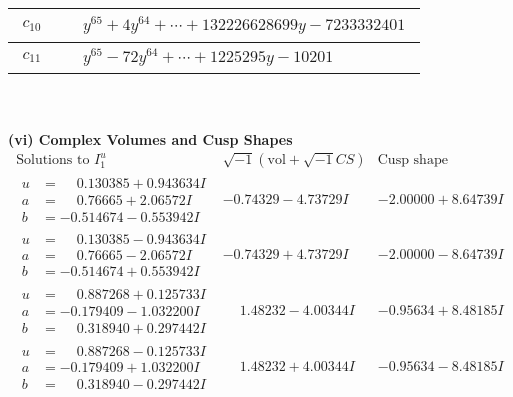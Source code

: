 \documentclass[1p]{elsarticle_modified}
\theoremstyle{definition}
\newcommand{\I}{\sqrt{-1}}
\begin{document}
\begin{tabular}{m{50pt}|m{274pt}}
\hline $$\begin{aligned}c_{10}\end{aligned}$$&$\begin{aligned}
&y^{65}+4 y^{64}+\cdots+132226628699 y-7233332401
\end{aligned}$\\
\hline $$\begin{aligned}c_{11}\end{aligned}$$&$\begin{aligned}
&y^{65}-72 y^{64}+\cdots+1225295 y-10201
\end{aligned}$\\
\hline
\end{tabular}\\~\\
\newpage\flushleft \textbf{(vi) Complex Volumes and Cusp Shapes}
$$\begin{array}{c|c|c}  
\text{Solutions to }I^u_{1}& \I (\text{vol} + \sqrt{-1}CS) & \text{Cusp shape}\\
 \hline 
\begin{aligned}
u &= \phantom{-}0.130385 + 0.943634 I \\
a &= \phantom{-}0.76665 + 2.06572 I \\
b &= -0.514674 - 0.553942 I\end{aligned}
 & -0.74329 - 4.73729 I & -2.00000 + 8.64739 I \\ \hline\begin{aligned}
u &= \phantom{-}0.130385 - 0.943634 I \\
a &= \phantom{-}0.76665 - 2.06572 I \\
b &= -0.514674 + 0.553942 I\end{aligned}
 & -0.74329 + 4.73729 I & -2.00000 - 8.64739 I \\ \hline\begin{aligned}
u &= \phantom{-}0.887268 + 0.125733 I \\
a &= -0.179409 - 1.032200 I \\
b &= \phantom{-}0.318940 + 0.297442 I\end{aligned}
 & \phantom{-}1.48232 - 4.00344 I & -0.95634 + 8.48185 I \\ \hline\begin{aligned}
u &= \phantom{-}0.887268 - 0.125733 I \\
a &= -0.179409 + 1.032200 I \\
b &= \phantom{-}0.318940 - 0.297442 I\end{aligned}
 & \phantom{-}1.48232 + 4.00344 I & -0.95634 - 8.48185 I \\ \hline\begin{aligned}

\end{aligned}
\end{array}$$
\end{document}
